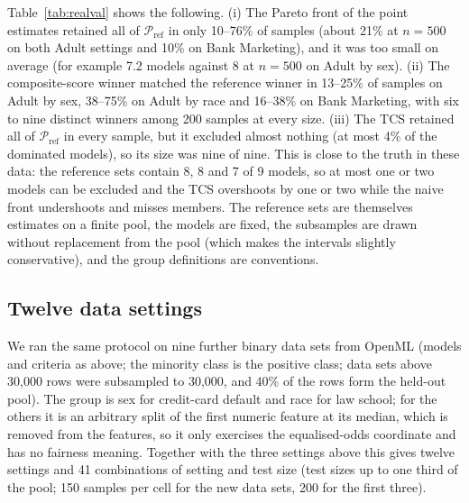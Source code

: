 \documentclass[11pt,a4paper]{article}
\begin{document}
Table~\ref{tab:realval} shows the following. (i) The Pareto front of the point estimates retained all of $\mathcal{P}_{\mathrm{ref}}$ in only 10--76\% of samples (about 21\% at $n=500$ on both Adult settings and 10\% on Bank Marketing), and it was too small on average (for example 7.2 models against 8 at $n=500$ on Adult by sex). (ii) The composite-score winner matched the reference winner in 13--25\% of samples on Adult by sex, 38--75\% on Adult by race and 16--38\% on Bank Marketing, with six to nine distinct winners among 200 samples at every size. (iii) The TCS retained all of $\mathcal{P}_{\mathrm{ref}}$ in every sample, but it excluded almost nothing (at most 4\% of the dominated models), so its size was nine of nine. This is close to the truth in these data: the reference sets contain 8, 8 and 7 of 9 models, so at most one or two models can be excluded and the TCS overshoots by one or two while the naive front undershoots and misses members. The reference sets are themselves estimates on a finite pool, the models are fixed, the subsamples are drawn without replacement from the pool (which makes the intervals slightly conservative), and the group definitions are conventions.

\begin{table}[h]\centering\small
\caption{Validation against a large held-out pool (200 samples per row, nine models, four criteria). Retention: share of samples in which all models of the reference nondominated set were kept. Winner correct: share of samples whose composite-score winner equals the reference winner. Excl.: share of reference-dominated models excluded by the TCS.}\label{tab:realval}

\end{table}

\subsection{Twelve data settings}\label{sec:multi}
We ran the same protocol on nine further binary data sets from OpenML (models and criteria as above; the minority class is the positive class; data sets above 30,000 rows were subsampled to 30,000, and 40\% of the rows form the held-out pool). The group is sex for credit-card default and race for law school; for the others it is an arbitrary split of the first numeric feature at its median, which is removed from the features, so it only exercises the equalised-odds coordinate and has no fairness meaning. Together with the three settings above this gives twelve settings and 41 combinations of setting and test size (test sizes up to one third of the pool; 150 samples per cell for the new data sets, 200 for the first three).
\end{document}

